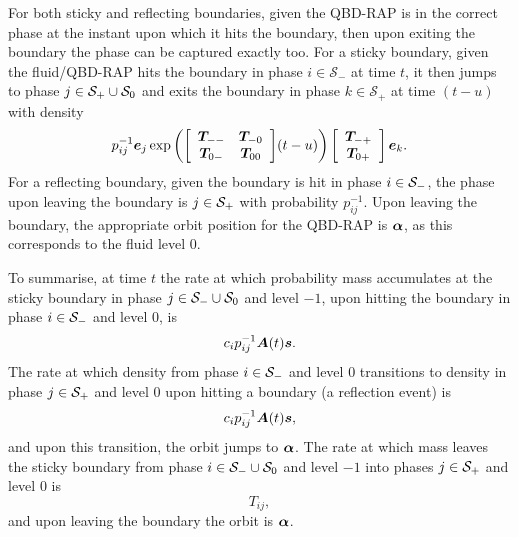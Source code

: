 For both sticky and reflecting boundaries, given the QBD-RAP is in the correct phase at the instant upon which it hits the boundary, then upon exiting the boundary the phase can be captured exactly too. For a sticky boundary, given the fluid/QBD-RAP hits the boundary in phase \(i\in\mathcal S_-\) at time \(t\), it then jumps to phase \(j\in\mathcal{S}_+\cup\mathcal{S}_0\) and exits the boundary in phase \(k\in\mathcal S_+\) at time \((t-u)\) with density 
\[p_{ij}^{-1}\boldsymbol e_j \exp\left({\left[\begin{array}{cc} \boldsymbol T_{--} & \boldsymbol T_{-0} \\ \boldsymbol T_{0-} & \boldsymbol T_{00}\end{array}\right]}(t-u)\right)\left[\begin{array}{c} \boldsymbol T_{-+} \\ \boldsymbol T_{0+}\end{array}\right]\boldsymbol e_k.\] 
For a reflecting boundary, given the boundary is hit in phase \(i\in\mathcal{S}_-\), the phase upon leaving the boundary is \(j\in\mathcal{S}_+\) with probability \(p_{ij}^{-1}\). Upon leaving the boundary, the appropriate orbit position for the QBD-RAP is \(\boldsymbol \alpha\), as this corresponds to the fluid level \(0\). 

To summarise, at time \(t\) the rate at which probability mass accumulates at the sticky boundary in phase \(j \in\mathcal{S}_-\cup\mathcal{S}_0\) and level \(-1\), upon hitting the boundary in phase \(i\in\mathcal{S}_-\) and level \(0\), is 
\[ c_ip_{ij}^{-1} \boldsymbol A(t)\boldsymbol s.\]
The rate at which density from phase \(i\in\mathcal{S}_-\) and level \(0\) transitions to density in phase \(j\in\mathcal{S}_+\) and level \(0\) upon hitting a boundary (a reflection event) is 
\[ c_ip_{ij}^{-1} \boldsymbol A(t)\boldsymbol s,\]
and upon this transition, the orbit jumps to \(\boldsymbol \alpha\). 
The rate at which mass leaves the sticky boundary from phase \(i\in\mathcal{S}_-\cup\mathcal{S}_0\) and level \(-1\) into phases \(j\in\mathcal{S}_+\) and level \(0\) is 
\[T_{ij},\]
and upon leaving the boundary the orbit is \(\boldsymbol\alpha\). 

